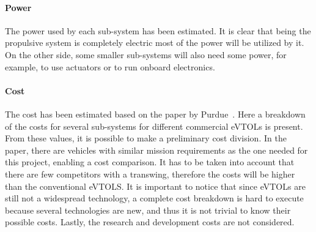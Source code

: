   \paragraph{Power} The power used by each sub-system has been estimated.
  It is clear that being the propulsive system is completely electric most of the power will be utilized by it.
  On the other side, some smaller sub-systems will also need some power, for example, to use actuators or to run onboard electronics.
\vspace{-5mm}
  \paragraph{Cost} The cost has been estimated based on the paper by Purdue~\cite{purdue_cesun}.
  Here a breakdown of the costs for several sub-systems for different commercial eVTOLs is present.
  From these values, it is possible to make a preliminary cost division.
  In the paper, there are vehicles with similar mission requirements as the one needed for this project, enabling a cost comparison.
  It has to be taken into account that there are few competitors with a transwing, therefore the costs will be higher than the conventional eVTOLS. It is important to notice that since eVTOLs are still not a widespread technology, a complete cost breakdown is hard to execute because several technologies are new, and thus it is not trivial to know their possible costs.
  Lastly, the research and development costs are not considered.















